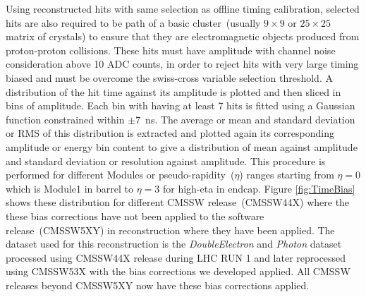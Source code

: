 Using reconstructed hits with same selection as offline timing calibration, selected hits are also required to be path of a basic cluster~(usually $9\times 9 $ or $25\times 25$ matrix of crystals) to ensure that they are electromagnetic objects produced from proton-proton collisions. These hits must have amplitude with channel noise consideration above 10 ADC counts, in order to reject hits with very large timing biased and must be overcome the swiss-cross variable selection threshold. A distribution of the hit time against its amplitude is plotted and then sliced in bins of amplitude. Each bin with having at least 7 hits is fitted using a Gaussian function constrained within $\pm 7$~ns. The average or mean and standard deviation or RMS of this distribution is extracted and plotted again its corresponding amplitude or energy bin content to give a distribution of mean against amplitude and standard deviation or resolution against amplitude. This procedure is performed for different Modules or pseudo-rapidity~($\eta$) ranges starting from $\eta = 0$ which is Module1 in barrel to $\eta = 3$ for high-eta in endcap.
Figure \ref{fig:TimeBias} shows these distribution for different CMSSW release~(CMSSW44X) where the these bias corrections have not been applied to the software release~(CMSSW5XY) in reconstruction where they have been applied. The dataset used for this reconstruction is the \textit{DoubleElectron} and \textit{Photon} dataset processed using CMSSW44X release during LHC RUN 1 and later reprocessed using CMSSW53X with the bias corrections we developed applied. All CMSSW releases beyond CMSSW5XY now have these bias corrections applied. 

